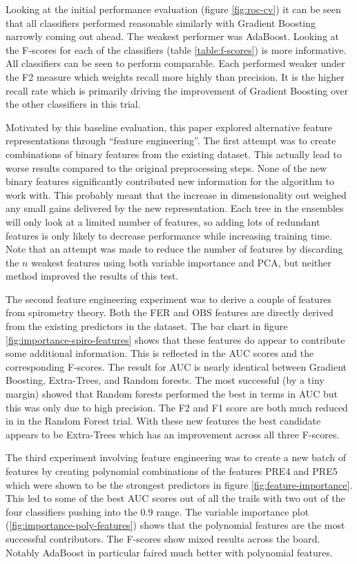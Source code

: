 \documentclass[journal]{IEEEtran}
\begin{document}
Looking at the initial performance evaluation (figure \ref{fig:roc-cv}) it can be seen that all classifiers performed reasonable similarly with Gradient Boosting narrowly coming out ahead. The weakest performer was AdaBoost. Looking at the F-scores for each of the classifiers (table \ref{table:f-scores}) is more informative. All classifiers can be seen to perform comparable. Each performed weaker under the F2 measure which weights recall more highly than precision. It is the higher recall rate which is primarily driving the improvement of Gradient Boosting over the other classifiers in this trial.

Motivated by this baseline evaluation, this paper explored alternative feature representations through ``feature engineering''. The first attempt was to create combinations of binary features from the existing dataset. This actually lead to worse results compared to the original preprocessing steps. None of the new binary features significantly contributed new information for the algorithm to work with. This probably meant that the increase in dimensionality out weighed any small gains delivered by the new representation. Each tree in the ensembles will only look at a limited number of features, so adding lots of redundant features is only likely to decrease performance while increasing training time. Note that an attempt was made to reduce the number of features by discarding the $n$ weakest features using both variable importance and PCA, but neither method improved the results of this test.

The second feature engineering experiment was to derive a couple of features from spirometry theory. Both the FER and OBS features are directly derived from the existing predictors in the dataset. The bar chart in figure \ref{fig:importance-spiro-features} shows that these features do appear to contribute some additional information. This is reflected in the AUC scores and the corresponding F-scores. The result for AUC is nearly identical between Gradient Boosting, Extra-Trees, and Random forests. The most successful (by a tiny margin) showed that Random forests performed the best in terms in AUC but this was only due to high precision. The F2 and F1 score are both much reduced in in the Random Forest trial. With these new features the best candidate appears to be Extra-Trees which has an improvement across all three F-scores.

The third experiment involving feature engineering was to create a new batch of features by creating polynomial combinations of the features PRE4 and PRE5 which were shown to be the strongest predictors in figure \ref{fig:feature-importance}. This led to some of the best AUC scores out of all the trails with two out of the four classifiers pushing into the 0.9 range. The variable importance plot (\ref{fig:importance-poly-features}) shows that the polynomial features are the most successful contributors. The F-scores show mixed results across the board. Notably AdaBoost in particular faired much better with polynomial features.
\end{document}
